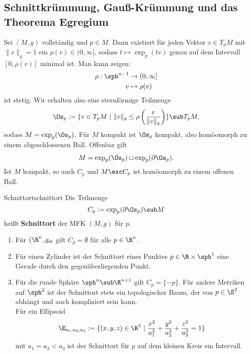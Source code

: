 \subsection{Schnittkrümmung, Gauß-Krümmung und das Theorema Egregium}
\label{schnittgauß}
\begin{bemerkung}
Sei $(M,g)$ vollständig und $p \in M$. Dann existiert für jeden Vektor $v \in T_pM$ mit $\| v \|_g = 1$ ein $\rho (v) \in (0, \infty]$, sodass $t \mapsto \exp_p (tv)$ genau auf dem Intervall $[0,\rho(v)]$ minimal ist. Man kann zeigen:
\begin{align}
\rho: \sph^{n-1} &\to (0, \infty]\\
v &\mapsto \rho(v)
\end{align}
ist stetig. Wir erhalten also eine sternförmige Teilmenge
\begin{equation}
\Os_p := \{ v \in T_pM \ | \ \|v\|_g \leq \rho \left(\frac{v}{\|v\|_g} \right)\} \sub T_pM,
\end{equation}
sodass $M = \exp_p (\Os_p)$. Für $M$ kompakt ist $\Os_p$ kompakt, also homöomorph zu einem abgeschlossenen Ball. Offenbar gilt
\begin{equation}
M = \exp_p(\dot{\Os_p}) \sqcup \exp_p(\partial \Os_p).
\end{equation}
Ist $M$ kompakt, so auch $C_p$ und $M \exc C_p$ ist homöomorph zu einem offenen Ball.
\end{bemerkung}
\begin{definition}{Schnittort}{schnittort}
Die Teilmenge 
\begin{equation}
C_p := \exp_p(\partial \Os_p) \sub M
\end{equation}
heißt \textbf{Schnittort} der MFK $(M,g)$ für $p$.
\end{definition}
\begin{beispiele}
\begin{enumerate}
\item Für $(\R^n, g_\text{st}$ gilt $C_p = \emptyset$ für alle $p \in \R^n$.
\item Für einen Zylinder ist der Schnittort eines Punktes $p \in \R \times \sph^1$ eine Gerade durch den gegenüberliegenden Punkt.
\item Für die runde Sphäre $\sph^n \sub \R^{n+1}$ gilt $C_p = \{-p\}$. Für andere Metriken auf $\sph^2$ ist der Schnittort stets ein topologischer Baum, der von $p \in \S^2$ abhängt und auch kompliziert sein kann.\\
Für ein Ellipsoid
\begin{equation}
\E_{a_1,a_2,a_3} := \{(x,y,z) \in \R^3 \ | \ \frac{x^2}{a_1^2}+ \frac{y^2}{a_2^2} + \frac{z^2}{a_3^2} = 1 \}
\end{equation}
mit $a_1 = a_2 < a_3$ ist der Schnittort für $p$ auf dem kleinen Kreis ein Intervall.
\end{enumerate}
\end{beispiele}
